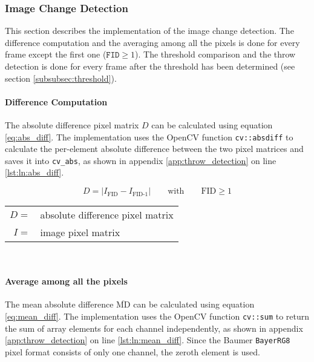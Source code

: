 \subsubsection{Image Change Detection}
\label{subsubsec:image_change_detection}

This section describes the implementation of the image change detection.
The difference computation and the averaging among all the pixels is done for every frame except the first one ($\texttt{FID} \geq 1$).
The threshold comparison and the throw detection is done for every frame after the threshold has been determined (see section \ref{subsubsec:threshold}).

\paragraph{Difference Computation}
The absolute difference pixel matrix $D$ can be calculated using equation \ref{eq:abs_diff}.
The implementation uses the OpenCV function \texttt{cv::absdiff} to calculate the per-element absolute difference between the two pixel matrices and saves it into \texttt{cv\_abs}, as shown in appendix \ref{app:throw_detection} on line \ref{lst:ln:abs_diff}.

\begin{equation}
  D = |I_\text{FID} - I_\text{FID-1}| \quad\quad \text{with} \quad\quad \text{FID} \geq 1
  \label{eq:abs_diff}
\end{equation}

\begin{tabular}{rl}
  $D =$ & absolute difference pixel matrix \\
  $I =$ & image pixel matrix \\
\end{tabular}
\\

\paragraph{Average among all the pixels}
The mean absolute difference $\overline{\text{MD}}$ can be calculated using equation \ref{eq:mean_diff}.
The implementation uses the OpenCV function \texttt{cv::sum} to return the sum of array elements for each channel independently, as shown in appendix \ref{app:throw_detection} on line \ref{lst:ln:mean_diff}.
Since the Baumer \texttt{BayerRG8} pixel format consists of only one channel, the zeroth element is used.


